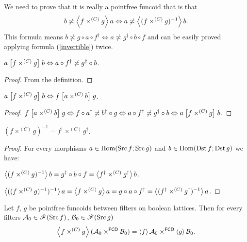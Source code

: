 We need to prove that it is really a pointfree funcoid that is that
\[
b\not\asymp\left\langle f\times^{(C)}g\right\rangle a\Leftrightarrow a\not\asymp\left\langle (f\times^{(C)}g)^{-1}\right\rangle b.
\]
This formula means $b\nasymp g\circ a\circ f^{\dagger}\Leftrightarrow a\nasymp g^{\dagger}\circ b\circ f$
and can be easily proved applying formula (\ref{invertible})
twice.
\begin{prop}
$a\mathrel{\left[f\times^{(C)}g\right]}b\Leftrightarrow a\circ f^{\dagger}\not\asymp g^{\dagger}\circ b$.\end{prop}
\begin{proof}
From the definition.\end{proof}
\begin{prop}
$a\mathrel{\left[f\times^{(C)}g\right]}b\Leftrightarrow f\mathrel{\left[a\times^{(C)}b\right]}g$.\end{prop}
\begin{proof}
$f\mathrel{\left[a\times^{(C)}b\right]}g\Leftrightarrow f\circ a^{\dagger}\not\asymp b^{\dagger}\circ g\Leftrightarrow a\circ f^{\dagger}\not\asymp g^{\dagger}\circ b\Leftrightarrow a\mathrel{\left[f\times^{(C)}g\right]}b$.\end{proof}
\begin{thm}
$(f\times^{(C)}g)^{-1}=f^{\dagger}\times^{(C)}g^{\dagger}$.\end{thm}
\begin{proof}
For every morphisms $a\in\operatorname{Hom}(\operatorname{Src} f;\operatorname{Src} g)$ and $b\in\operatorname{Hom}(\operatorname{Dst} f;\operatorname{Dst} g)$
we have:

$\left\langle (f\times^{(C)}g)^{-1}\right\rangle b=g^{\dagger}\circ b\circ f=\left\langle f^{\dagger}\times^{(C)}g^{\dagger}\right\rangle b$.

$\left\langle ((f\times^{(C)}g)^{-1})^{-1}\right\rangle a=\left\langle f\times^{(C)}g\right\rangle a=g\circ a\circ f^{\dagger}=\left\langle (f^{\dagger}\times^{(C)}g^{\dagger})^{-1}\right\rangle a$.
\end{proof}
\begin{thm}
Let $f$, $g$ be pointfree funcoids between filters on boolean lattices.
Then for every filters $\mathcal{A}_{0}\in\mathscr{F}(\operatorname{Src} f)$, $\mathcal{B}_{0}\in\mathscr{F}(\operatorname{Src} g)$
\[
\left\langle f\times^{(C)}g\right\rangle(\mathcal{A}_{0}\times^{\mathsf{FCD}}\mathcal{B}_{0})=\left\langle f\right\rangle\mathcal{A}_{0}\times^{\mathsf{FCD}}\left\langle g\right\rangle\mathcal{B}_{0}.
\]
\end{thm}

